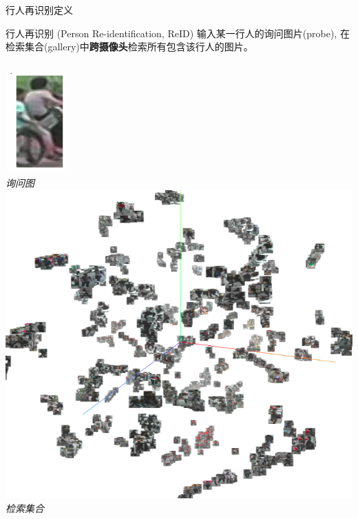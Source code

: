 \documentclass[usenames,dvipsnames,notes]{beamer}
\begin{document}
\begin{frame}
	{行人再识别定义}
	\begin{block}{行人再识别 (Person Re-identification,  ReID)}
		输入某一行人的询问图片(probe), 在检索集合(gallery)中{\bf 跨摄像头}检索所有包含该行人的图片。
	\end{block}
	\begin{columns}
		\centering
		\includegraphics[width=0.5\linewidth]{2018-03-12-10-05-13.png} \\
		\it 询问图
		\centering
		\includegraphics[width=0.72\linewidth]{2018-03-12-09-57-11.png} \\
		\it 检索集合
	\end{columns}
\end{frame}
\end{document}

